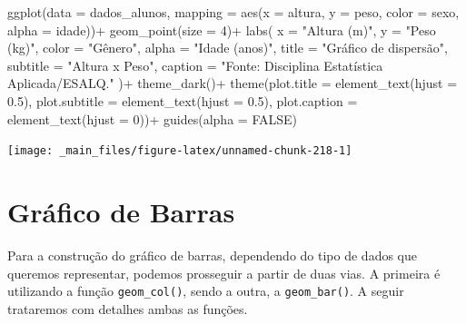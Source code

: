 \documentclass[
  brazilian,
]{book}
\newenvironment{Shaded}{\begin{snugshade}}{\end{snugshade}}
\newcommand{\AttributeTok}[1]{\textcolor[rgb]{0.77,0.63,0.00}{#1}}
\newcommand{\ConstantTok}[1]{\textcolor[rgb]{0.00,0.00,0.00}{#1}}
\newcommand{\DecValTok}[1]{\textcolor[rgb]{0.00,0.00,0.81}{#1}}
\newcommand{\FloatTok}[1]{\textcolor[rgb]{0.00,0.00,0.81}{#1}}
\newcommand{\FunctionTok}[1]{\textcolor[rgb]{0.00,0.00,0.00}{#1}}
\newcommand{\NormalTok}[1]{#1}
\newcommand{\SpecialCharTok}[1]{\textcolor[rgb]{0.00,0.00,0.00}{#1}}
\newcommand{\StringTok}[1]{\textcolor[rgb]{0.31,0.60,0.02}{#1}}
\begin{document}
\begin{Shaded}
\begin{Highlighting}[]
\FunctionTok{ggplot}\NormalTok{(}\AttributeTok{data =}\NormalTok{ dados\_alunos,}
       \AttributeTok{mapping =} \FunctionTok{aes}\NormalTok{(}\AttributeTok{x =}\NormalTok{ altura,}
                     \AttributeTok{y =}\NormalTok{ peso,}
                     \AttributeTok{color =}\NormalTok{ sexo,}
                     \AttributeTok{alpha =}\NormalTok{ idade))}\SpecialCharTok{+}
  \FunctionTok{geom\_point}\NormalTok{(}\AttributeTok{size =} \DecValTok{4}\NormalTok{)}\SpecialCharTok{+}
  \FunctionTok{labs}\NormalTok{(}
    \AttributeTok{x =} \StringTok{"Altura (m)"}\NormalTok{,}
    \AttributeTok{y =} \StringTok{"Peso (kg)"}\NormalTok{,}
    \AttributeTok{color =} \StringTok{"Gênero"}\NormalTok{,}
    \AttributeTok{alpha =} \StringTok{"Idade (anos)"}\NormalTok{,}
    \AttributeTok{title =} \StringTok{"Gráfico de dispersão"}\NormalTok{,}
    \AttributeTok{subtitle =} \StringTok{"Altura x Peso"}\NormalTok{,}
    \AttributeTok{caption =} \StringTok{"Fonte: Disciplina Estatística Aplicada/ESALQ."}
\NormalTok{  )}\SpecialCharTok{+}
  \FunctionTok{theme\_dark}\NormalTok{()}\SpecialCharTok{+}
  \FunctionTok{theme}\NormalTok{(}\AttributeTok{plot.title =} \FunctionTok{element\_text}\NormalTok{(}\AttributeTok{hjust =} \FloatTok{0.5}\NormalTok{),}
        \AttributeTok{plot.subtitle =} \FunctionTok{element\_text}\NormalTok{(}\AttributeTok{hjust =} \FloatTok{0.5}\NormalTok{),}
        \AttributeTok{plot.caption =} \FunctionTok{element\_text}\NormalTok{(}\AttributeTok{hjust =} \DecValTok{0}\NormalTok{))}\SpecialCharTok{+}
  \FunctionTok{guides}\NormalTok{(}\AttributeTok{alpha =} \ConstantTok{FALSE}\NormalTok{)}
\end{Highlighting}
\end{Shaded}

\begin{center}\texttt{[image: \_main\_files/figure-latex/unnamed-chunk-218-1]} \end{center}

\hypertarget{gruxe1fico-de-barras}{%
\section{Gráfico de Barras}\label{gruxe1fico-de-barras}}

Para a construção do gráfico de barras, dependendo do tipo de dados que queremos representar, podemos prosseguir a partir de duas vias. A primeira é utilizando a função \texttt{geom\_col()}, sendo a outra, a \texttt{geom\_bar()}. A seguir trataremos com detalhes ambas as funções.
\end{document}
